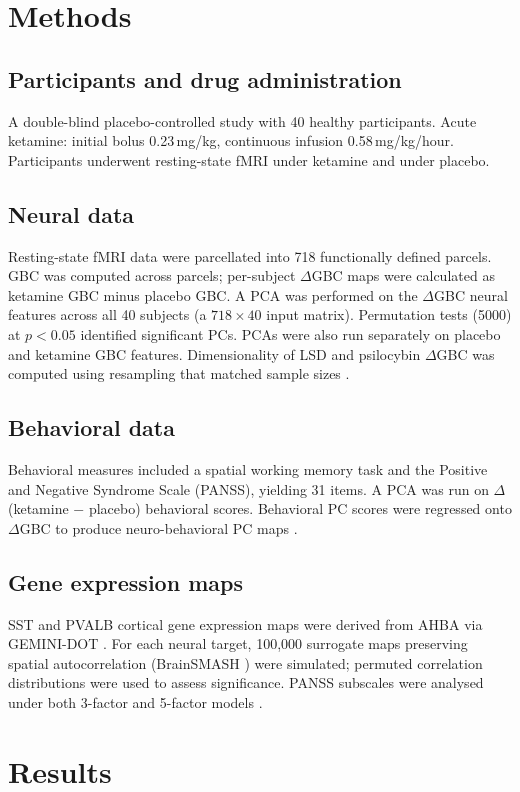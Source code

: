 \documentclass[11pt]{article}
\begin{document}
\section{Methods}
\subsection{Participants and drug administration}
A double-blind placebo-controlled study with 40 healthy participants. Acute ketamine: initial bolus 0.23\,mg/kg, continuous infusion 0.58\,mg/kg/hour. Participants underwent resting-state fMRI under ketamine and under placebo.

\subsection{Neural data}
Resting-state fMRI data were parcellated into 718 functionally defined parcels. GBC was computed across parcels; per-subject $\Delta$GBC maps were calculated as ketamine GBC minus placebo GBC. A PCA was performed on the $\Delta$GBC neural features across all 40 subjects (a $718 \times 40$ input matrix). Permutation tests (5000) at $p<0.05$ identified significant PCs. PCAs were also run separately on placebo and ketamine GBC features. Dimensionality of LSD and psilocybin $\Delta$GBC was computed using resampling that matched sample sizes \citep{r54,r55,r56}.

\subsection{Behavioral data}
Behavioral measures included a spatial working memory task and the Positive and Negative Syndrome Scale (PANSS), yielding 31 items. A PCA was run on $\Delta$ (ketamine $-$ placebo) behavioral scores. Behavioral PC scores were regressed onto $\Delta$GBC to produce neuro-behavioral PC maps \citep{r52}.

\subsection{Gene expression maps}
SST and PVALB cortical gene expression maps were derived from AHBA via GEMINI-DOT \citep{r50}. For each neural target, 100,000 surrogate maps preserving spatial autocorrelation (BrainSMASH \citep{r57}) were simulated; permuted correlation distributions were used to assess significance. PANSS subscales were analysed under both 3-factor and 5-factor models \citep{r58}.

\section{Results}
\end{document}
